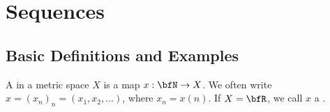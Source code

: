\chapter{Sequences}\label{chapter:sequences}
\vspace{12pt}

\section{Basic Definitions and Examples}
    \begin{definition}
        A  in a metric space $X$ is a map $x:\bfN \rightarrow X$. We often write $x = (x_n)_n = (x_1,x_2,...)$, where $x_n = x(n)$. If $X = \bfR$, we call $x$ a .
    \end{definition}

